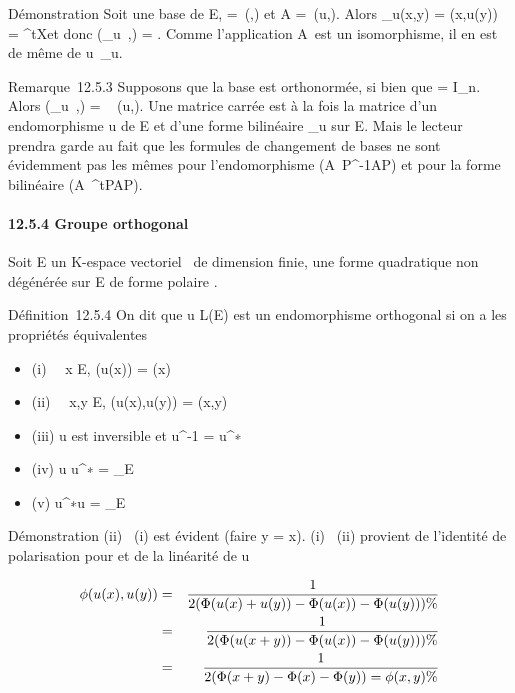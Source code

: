 \documentclass[]{article}
\begin{document}
Démonstration Soit  une base de E, \Omega =\
\mathrmMat (\phi,) et A =\
\mathrmMat (u,). Alors \psi\_u(x,y) =
\phi(x,u(y)) = ^tX\OmegaAY et donc
\mathrmMat (\psi\_u~,\mathcal{E})
= \OmegaA. Comme l'application A\mapsto~\OmegaA est un
isomorphisme, il en est de même de
u\mapsto~\psi\_u.

Remarque~12.5.3 Supposons que la base  est orthonormée, si bien que \Omega =
I\_n. Alors
\mathrmMat (\psi\_u~,)
= \mathrmMat~ (u,\mathcal{E}). Une
matrice carrée est à la fois la matrice d'un endomorphisme u de E et
d'une forme bilinéaire \psi\_u sur E. Mais le lecteur prendra garde
au fait que les formules de changement de bases ne sont évidemment pas
les mêmes pour l'endomorphisme
(A\mapsto~P^-1AP) et pour la forme
bilinéaire (A\mapsto~^tPAP).

\paragraph{12.5.4 Groupe orthogonal}

Soit E un K-espace vectoriel ~de dimension finie, \Phi une forme
quadratique non dégénérée sur E de forme polaire \phi.

Définition~12.5.4 On dit que u \in L(E) est un endomorphisme orthogonal si
on a les propriétés équivalentes

\begin{itemize}
\itemsep1pt\parskip0pt
\item
  (i) \forall~~x \in E, \Phi(u(x)) = \Phi(x)
\item
  (ii) \forall~~x,y \in E, \phi(u(x),u(y)) = \phi(x,y)
\item
  (iii) u est inversible et u^-1 = u^∗
\item
  (iv) u \cdot u^∗ = \mathrmId\_E
\item
  (v) u^∗\cdot u = \mathrmId\_E
\end{itemize}

Démonstration (ii) \rigtharrow~(i) est évident (faire y = x). (i) \rigtharrow~(ii) provient de
l'identité de polarisation pour \Phi et de la linéarité de u

\begin{align*} \phi(u(x),u(y))& =& 1
\over 2 (\Phi(u(x) + u(y)) - \Phi(u(x)) - \Phi(u(y)))\%&
\\ & =& 1 \over 2
(\Phi(u(x + y)) - \Phi(u(x)) - \Phi(u(y))) \%& \\
& =& 1 \over 2 (\Phi(x + y) - \Phi(x) - \Phi(y)) = \phi(x,y)
\%& \\ \end{align*}
\end{document}
